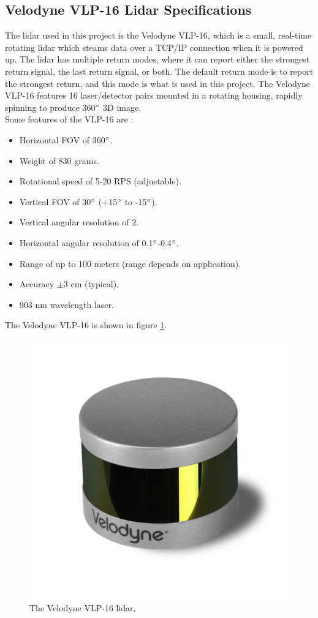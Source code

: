 \subsection{Velodyne VLP-16 Lidar Specifications}
The lidar used in this project is the Velodyne VLP-16, which is a small, real-time rotating lidar which steams data over a TCP/IP connection when it is powered up. The lidar has multiple return modes, where it can report either the strongest return signal, the last return signal, or both. The default return mode is to report the strongest return, and this mode is what is used in this project. The Velodyne VLP-16 features 16 laser/detector pairs mounted in a rotating housing, rapidly spinning to produce 360$\degree$ 3D image.\smallskip \\
Some features of the VLP-16 are \cite{velodyne_vlp16}:
\begin{itemize}
	\item Horizontal FOV of 360$\degree$.
	\item Weight of 830 grams.
	\item Rotational speed of 5-20 RPS (adjustable).
	\item Vertical FOV of 30$\degree$ (+15$\degree$ to -15$\degree$).
	\item Vertical angular resolution of 2\degree.
	\item Horizontal angular resolution of 0.1$\degree$-0.4$\degree$.
	\item Range of up to 100 meters (range depends on application).
	\item Accuracy $\pm3$ cm (typical).
	\item 903 nm wavelength laser.
\end{itemize}
The Velodyne VLP-16 is shown in figure \ref{fig:vlp_16}.
\begin{figure}[H]
	\centering
	\includegraphics[width=.7\linewidth]{fig/Velodyne_LiDAR_Puck_VLP-16_Left_900.png}
	\caption{The Velodyne VLP-16 lidar.}
	\label{fig:vlp_16}
\end{figure}
